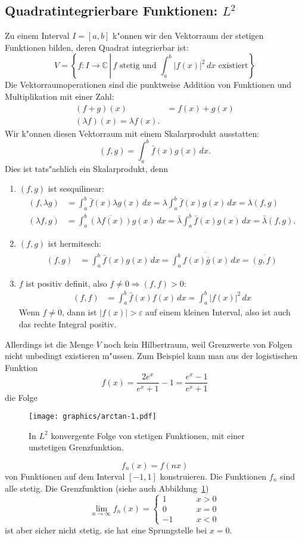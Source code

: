 \subsection{Quadratintegrierbare Funktionen: $L^2$}
Zu einem Interval $I=[a,b]$ k"onnen wir den Vektorraum der stetigen Funktionen
bilden, deren Quadrat integrierbar ist:
\[
V=\left\{
f:I\to\mathbb C\,\left|\,
\text{$f$ stetig und $\displaystyle \int_a^b|f(x)|^2\,dx$ existiert}
\right. \right\}
\]
Die Vektorraumoperationen sind die punktweise Addition von Funktionen
und Multiplikation mit einer Zahl:
\begin{align*}
(f+g)(x)&=f(x)+g(x)\\
(\lambda f)(x)=\lambda f(x).
\end{align*}
Wir k"onnen diesen Vektorraum mit einem Skalarprodukt ausstatten:
\[
(f,g)=\int_a^b \bar f(x)g(x)\,dx.
\]
Dies ist tats"achlich ein Skalarprodukt, denn
\begin{enumerate}
\item $(f,g)$ ist sesquilinear:
\begin{align*}
(f,\lambda g)&=\int_a^b\bar f(x)\lambda g(x)\,dx
=\lambda\int_a^b\bar f(x)g(x)\,dx = \lambda(f,g)
\\
(\lambda f,g)&=\int_a^b\overline{(\lambda f(x))}g(x)\,dx
=
\bar\lambda\int_a^b\bar f(x)g(x)\,dx=\bar\lambda (f,g).
\end{align*}
\item $(f,g)$ ist hermitesch:
\begin{align*}
(f,g)&=\int_a^b\bar f(x)g(x)\,dx = \overline{
\int_a^b f(x)\bar g(x)\,dx
}
=
\overline{(g,f)}
\end{align*}
\item $f$ ist positiv definit, also $f\ne 0\Rightarrow (f,f) >0$:
\begin{align*}
(f,f)&=\int_a^b \bar f(x)f(x)\,dx=\int_a^b|f(x)|^2\,dx
\end{align*}
Wenn $f\ne 0$, dann ist $|f(x)|>\varepsilon$ auf einem kleinen Interval,
also ist auch das rechte Integral positiv.
\end{enumerate}
Allerdings ist die Menge $V$ noch kein Hilbertraum, weil Grenzwerte von
Folgen nicht unbedingt existieren m"ussen. Zum Beispiel kann man aus
der logistischen Funktion
\[
f(x)=\frac{2e^x}{e^x+1}-1=\frac{e^x-1}{e^x+1}
\]
die Folge
\begin{figure}
\centering
\texttt{[image: graphics/arctan-1.pdf]}
\caption{In $L^2$ konvergente Folge von stetigen Funktionen, mit einer
unstetigen Grenzfunktion.
\label{logisticfunction}}
\end{figure}
\[
f_n(x)=f(nx)
\]
von Funktionen auf dem Interval $[-1,1]$ konstruieren. Die Funktionen
$f_n$ sind alle stetig.
Die Grenzfunktion (siehe auch Abbildung~\ref{logisticfunction})
\[
\lim_{n\to \infty}f_n(x)=\begin{cases}
1&\qquad x > 0\\
0&\qquad x = 0\\
-1&\qquad x < 0
\end{cases}
\]
ist aber sicher nicht stetig, sie hat eine Sprungstelle bei $x=0$.

